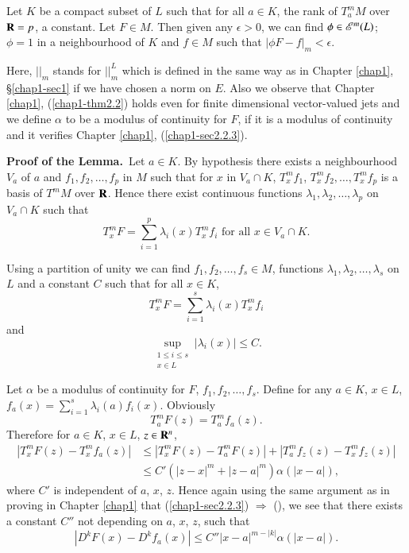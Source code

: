\begin{lemma}\label{chap2-lem1.4}
Let $K$ be a compact subset of $L$ such that for all $a\in K$, the rank of $T^{m}_{a}M$ over $\mathbf{R}=p$, a constant. Let $F\in M$. Then given any $\epsilon > 0$, we can find $\phi\in \mathscr{E}^{m}(L)$; $\phi=1$ in a neighbourhood of $K$ and $f\in M$ such that $|\phi F-f|_{m}<\epsilon$.
\end{lemma}

Here, $||_{m}$ stands for $||^{L}_{m}$ which is defined in the same way as in Chapter \ref{chap1}, \S\ref{chap1-sec1} if we have chosen a norm on $E$. Also we observe that Chapter \ref{chap1}, (\ref{chap1-thm2.2}) holds even for finite dimensional vector-valued jets and we define $\alpha$ to be a modulus of continuity for $F$, if it is a modulus of continuity and it verifies Chapter \ref{chap1}, (\ref{chap1-sec2.2.3}).

\medskip
\noindent
{\bf Proof of the Lemma.}~Let $a\in K$. By hypothesis there exists a neighbourhood $V_{a}$ of $a$ and $f_{1},f_{2},\ldots,f_{p}$ in $M$ such that for $x$ in $V_{a}\cap K$, $T^{m}_{x}f_{1}$, $T^{m}_{x}f_{2},\ldots,T^{m}_{x}f_{p}$ is a basis of $T^{m}M$ over $\mathbf{R}$. Hence there exist continuous functions $\lambda_{1},\lambda_{2},\ldots,\lambda_{p}$ on $V_{a}\cap K$ such that
$$
T^{m}_{x}F=\sum\limits^{p}_{i=1}\lambda_{i}(x)T^{m}_{x}f_{i}\text{ for all } x\in V_{a}\cap K.
$$

Using a partition of unity we can find $f_{1}, f_{2},\ldots,f_{s}\in M$, functions $\lambda_{1},\lambda_{2},\ldots,\lambda_{s}$ on $L$ and a constant $C$ such that for all $x\in K$,
$$
T^{m}_{x}F=\sum\limits^{s}_{i=1}\lambda_{i}(x)T^{m}_{x}f_{i}
$$
and
$$
\sup\limits_{\substack{1\leq i\leq s\\ x\in L}}|\lambda_{i}(x)|\leq C.
$$

Let $\alpha$ be a modulus of continuity for $F$, $f_{1},f_{2},\ldots,f_{s}$. Define for any $a\in K$, $x\in L$, $f_{a}(x)=\sum\limits^{s}_{i=1}\lambda_{i}(a)f_{i}(x)$. Obviously
$$
T^{m}_{a}F(z)=T^{m}_{a}f_{a}(z).
$$
Therefore for $a\in K$, $x\in L$, $z\in \mathbf{R}^{n}$,
\begin{align*}
|T^{m}_{x}F(z)-T^{m}_{x}f_{a}(z)| &\leq |T^{m}_{x}F(z)-T^{m}_{a}F(z)|+|T^{m}_{a}f_{z}(z)-T^{m}_{x}f_{z}(z)|\\
& \leq C'(|z-x|^{m}+|z-a|^{m})\alpha (|x-a|),\tag{1.4.2}\label{chap2-eq1.4.2}
\end{align*}
where $C'$ is independent of $a$, $x$, $z$. Hence again using the same argument as in proving in Chapter \ref{chap1} that (\ref{chap1-sec2.2.3}) $\Rightarrow$ (\label{chap1-sec2.2.2}), we see that there exists a constant $C''$ not depending on $a$, $x$, $z$, such that
\begin{equation*}
|D^{k}F(x)-D^{k}f_{a}(x)|\leq C''|x-a|^{m-|k|}\alpha(|x-a|).\tag{1.4.2}\label{chap2-add-eq1.4.2}
\end{equation*}

